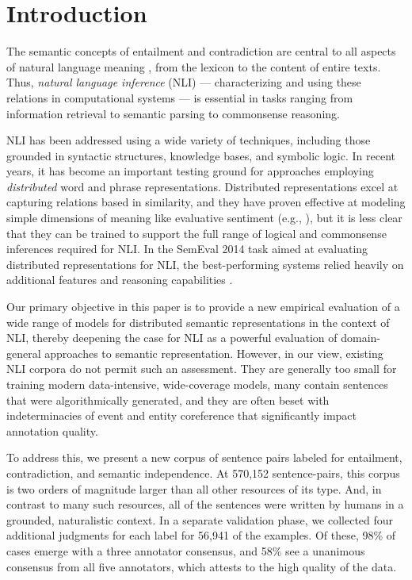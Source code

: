 \section{Introduction}\label{sec:introduction}

The semantic concepts of entailment and contradiction are central to
all aspects of natural language meaning
\cite{Katz72,vanBenthem08NATLOG}, from the lexicon to the content of
entire texts. Thus, \emph{natural language
  inference} (NLI) --- characterizing and using these relations in
computational systems
\cite{dagan2006pascal,MacCartney09,maccartney2009extended} --- is
essential in tasks ranging from information retrieval to semantic
parsing to commonsense reasoning.

NLI has been addressed using a wide variety of techniques, including
those grounded in syntactic structures, knowledge bases, and symbolic
logic. In recent years, it has become an important testing ground for
approaches employing \emph{distributed} word and phrase
representations. Distributed representations excel at capturing
relations based in similarity, and they have proven effective at
modeling simple dimensions of meaning like evaluative sentiment
(e.g., \citealt{socher2013recursive}), but it is less clear that they can be
trained to support the full range of logical and commonsense
inferences required for NLI. In the SemEval 2014 task aimed at evaluating distributed
representations for NLI, the best-performing systems relied heavily on
additional features and reasoning capabilities
\cite{marelli2014semeval}. 

Our primary objective in this paper is to provide a new empirical
evaluation of a wide range of models for distributed semantic
representations in the context of NLI, thereby deepening the case for
NLI as a powerful evaluation of domain-general approaches to semantic
representation. However, in our view, existing NLI corpora do not
permit such an assessment. They are generally too small for training
modern data-intensive, wide-coverage models, many contain sentences
that were algorithmically generated, and they are often beset with
indeterminacies of event and entity coreference that significantly
impact annotation quality.

To address this, we present a new corpus of sentence pairs labeled for
entailment, contradiction, and semantic independence. At 570,152
sentence-pairs, this corpus is two orders of magnitude larger than all
other resources of its type. And, in contrast to many such resources,
all of the sentences were written by humans in a grounded,
naturalistic context. In a separate validation phase, we collected
four additional judgments for each label for 56,941 of the examples.
Of these, 98\% of cases emerge with a three annotator consensus, 
and 58\% see a unanimous consensus from all five annotators, 
which attests to the high quality of the data.

